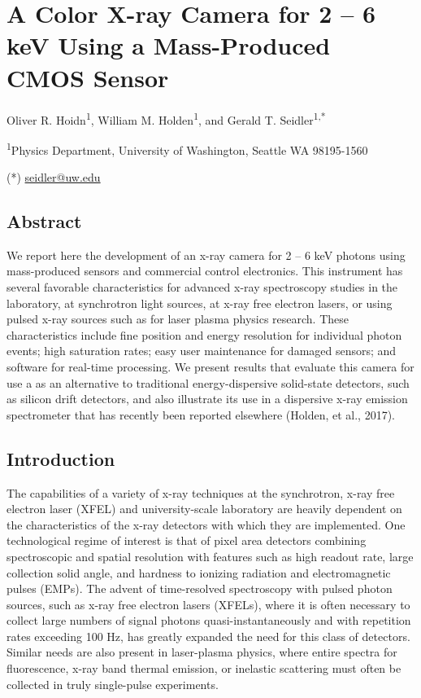 \chapter{A Color X-ray Camera for 2 -- 6 keV Using a Mass-Produced CMOS Sensor}
\label{cmos_ch2}
Oliver R. Hoidn\textsuperscript{1}, William M.
Holden\textsuperscript{1}, and Gerald T. Seidler\textsuperscript{1,*}

\textsuperscript{1}Physics Department, University of Washington, Seattle
WA 98195-1560

(*) \href{mailto:Seidler@uw.edu}{seidler@uw.edu}

\section{Abstract}
We report here the development of an x-ray camera for 2 -- 6 keV photons
using mass-produced sensors and commercial control electronics. This
instrument has several favorable characteristics for advanced x-ray
spectroscopy studies in the laboratory, at synchrotron light sources, at
x-ray free electron lasers, or using pulsed x-ray sources such as for
laser plasma physics research. These characteristics include fine
position and energy resolution for individual photon events; high
saturation rates; easy user maintenance for damaged sensors; and
software for real-time processing. We present results that evaluate this
camera for use a as an alternative to traditional energy-dispersive
solid-state detectors, such as silicon drift detectors, and also
illustrate its use in a dispersive x-ray emission spectrometer that has
recently been reported elsewhere (Holden, et al., 2017).

\section{Introduction}
The capabilities of a variety of x-ray techniques at the synchrotron,
x-ray free electron laser (XFEL) and university-scale laboratory are
heavily dependent on the characteristics of the x-ray detectors with
which they are implemented. One technological regime of interest is that
of pixel area detectors combining spectroscopic and spatial resolution
with features such as high readout rate, large collection solid angle,
and hardness to ionizing radiation and electromagnetic pulses (EMPs).
The advent of time-resolved spectroscopy with pulsed photon sources,
such as x-ray free electron lasers (XFELs), where it is often necessary
to collect large numbers of signal photons quasi-instantaneously and
with repetition rates exceeding 100 Hz, has greatly expanded the need
for this class of detectors. Similar needs are also present in
laser-plasma physics, where entire spectra for fluorescence, x-ray band
thermal emission, or inelastic scattering must often be collected in
truly single-pulse experiments.

